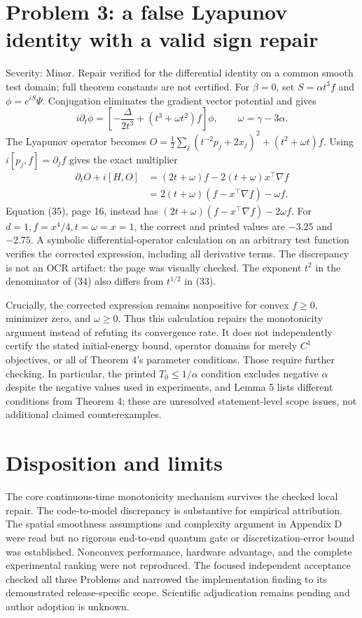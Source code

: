 \documentclass[10pt]{article}
\begin{document}
\section*{Problem 3: a false Lyapunov identity with a valid sign repair}
Severity: Minor. Repair verified for the differential identity on a common smooth test domain; full theorem constants are not certified. For \(\beta=0\), set \(S=\alpha t^3f\) and \(\phi=e^{iS}\Psi\). Conjugation eliminates the gradient vector potential and gives \[i\partial_t\phi=\left[-\frac{\Delta}{2t^3}
             +(t^3+\omega t^2)f\right]\phi,
 \qquad\omega=\gamma-3\alpha.\] The Lyapunov operator becomes \(O=\tfrac12\sum_j(t^{-2}p_j+2x_j)^2+(t^2+\omega t)f\). Using \(i[p_j,f]=\partial_jf\) gives the exact multiplier \[\begin{aligned}
 \partial_tO+i[H,O]
 &= (2t+\omega)f-2(t+\omega)x^\top\nabla f\\
 &=2(t+\omega)(f-x^\top\nabla f)-\omega f.\end{aligned}\] Equation (35), page 16, instead has \((2t+\omega)(f-x^\top\nabla f)-2\omega f\). For \(d=1,f=x^4/4,t=\omega=x=1\), the correct and printed values are \(-3.25\) and \(-2.75\). A symbolic differential-operator calculation on an arbitrary test function verifies the corrected expression, including all derivative terms. The discrepancy is not an OCR artifact: the page was visually checked. The exponent \(t^2\) in the denominator of (34) also differs from \(t^{1/2}\) in (33).\par
Crucially, the corrected expression remains nonpositive for convex \(f\ge0\), minimizer zero, and \(\omega\ge0\). Thus this calculation repairs the monotonicity argument instead of refuting its convergence rate. It does not independently certify the stated initial-energy bound, operator domains for merely \(C^1\) objectives, or all of Theorem 4’s parameter conditions. Those require further checking. In particular, the printed \(T_0\le1/\alpha\) condition excludes negative \(\alpha\) despite the negative values used in experiments, and Lemma 5 lists different conditions from Theorem 4; these are unresolved statement-level scope issues, not additional claimed counterexamples.\par
\section*{Disposition and limits}
The core continuous-time monotonicity mechanism survives the checked local repair. The code-to-model discrepancy is substantive for empirical attribution. The spatial smoothness assumptions and complexity argument in Appendix D were read but no rigorous end-to-end quantum gate or discretization-error bound was established. Nonconvex performance, hardware advantage, and the complete experimental ranking were not reproduced. The focused independent acceptance checked all three Problems and narrowed the implementation finding to its demonstrated release-specific scope. Scientific adjudication remains pending and author adoption is unknown.\par
\end{document}
